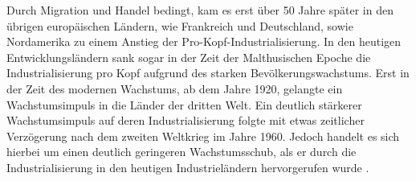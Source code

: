 %
Durch Migration und Handel bedingt, kam es erst über 50 Jahre später in den übrigen europäischen Ländern, wie Frankreich und Deutschland, sowie Nordamerika zu einem Anstieg der Pro-Kopf-Industrialisierung.  In den heutigen Entwicklungsländern sank sogar in der Zeit der Malthusischen Epoche die Industrialisierung pro Kopf aufgrund des starken Bevölkerungswachstums. Erst in der Zeit des modernen Wachstums, ab dem Jahre 1920, gelangte ein Wachstumsimpuls in die Länder der dritten Welt. Ein deutlich stärkerer Wachstumsimpuls auf deren Industrialisierung folgte mit etwas zeitlicher Verzögerung nach dem zweiten Weltkrieg im Jahre 1960. Jedoch handelt es sich hierbei um einen deutlich geringeren Wachstumsschub, als er durch die Industrialisierung in den heutigen Industrieländern hervorgerufen wurde \cite{Galor.2014}.\\
%
